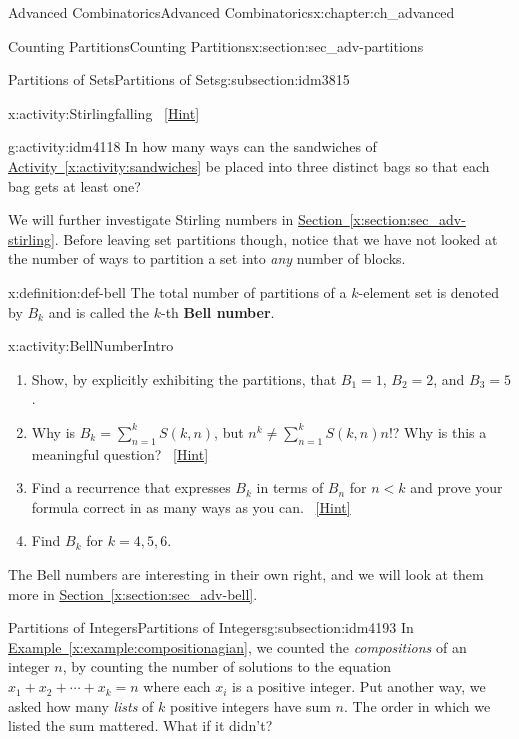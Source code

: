 \documentclass[oneside,10pt,]{book}
\newcommand{\terminology}[1]{\textbf{#1}}
\numberwithin{equation}{chapter}
\newcommand{\lt}{<}
\begin{document}
\begin{chapterptx}{Advanced Combinatorics}{}{Advanced Combinatorics}{}{}{x:chapter:ch_advanced}
\begin{sectionptx}{Counting Partitions}{}{Counting Partitions}{}{}{x:section:sec_adv-partitions}
\begin{subsectionptx}{Partitions of Sets}{}{Partitions of Sets}{}{}{g:subsection:idm3815}
\begin{activity}{}{x:activity:Stirlingfalling}
\qquad~\hfill{\tiny\hyperlink{g:hint:idm4107-back}{[Hint]}}\end{activity}
\begin{activity}{}{g:activity:idm4118}%
In how many ways can the sandwiches of \hyperref[x:activity:sandwiches]{Activity~\ref{x:activity:sandwiches}} be placed into three distinct bags so that each bag gets at least one?%
\end{activity}
We will further investigate Stirling numbers in \hyperref[x:section:sec_adv-stirling]{Section~\ref{x:section:sec_adv-stirling}}.  Before leaving set partitions though, notice that we have not looked at the number of ways to partition a set into \emph{any} number of blocks.%
\begin{definition}{}{x:definition:def-bell}%
%
%
The total number of partitions of a \(k\)-element set is denoted by \(B_k\) and is called the \(k\)-th \terminology{Bell number}.%
\end{definition}
\begin{activity}{}{x:activity:BellNumberIntro}%
\begin{enumerate}[font=\bfseries,label=(\alph*),ref=\alph*]
\item{}Show, by explicitly exhibiting the partitions, that \(B_1 = 1\), \(B_2 = 2\), and \(B_3 = 5\).%
\item{}Why is \(B_k = \sum_{n=1}^{k} S(k,n)\), but \(n^k \ne \sum_{n=1}^k S(k,n)n!\)?  Why is this a meaningful question?%
\qquad~\hfill{\tiny\hyperlink{g:hint:idm4156-back}{[Hint]}}\item{}Find a recurrence that expresses \(B_k\) in terms of \(B_n\) for \(n\lt  k\) and prove your formula correct in as many ways as you can.%
\qquad~\hfill{\tiny\hyperlink{g:hint:idm4166-back}{[Hint]}}\item{}Find \(B_k\) for \(k=4,5,6\).%
\end{enumerate}
\end{activity}
The Bell numbers are interesting in their own right, and we will look at them more in \hyperref[x:section:sec_adv-bell]{Section~\ref{x:section:sec_adv-bell}}.%
\end{subsectionptx}
%
%
\typeout{************************************************}
\typeout{************************************************}
%
\begin{subsectionptx}{Partitions of Integers}{}{Partitions of Integers}{}{}{g:subsection:idm4193}
In \hyperref[x:example:compositionagian]{Example~\ref{x:example:compositionagian}}, we counted the \emph{compositions} of an integer \(n\), by counting the number of solutions to the equation \(x_1 + x_2 + \cdots + x_k = n\) where each \(x_i\) is a positive integer.  Put another way, we asked how many \emph{lists} of \(k\) positive integers have sum \(n\).  The order in which we listed the sum mattered.  What if it didn't?%

\end{subsectionptx}
\end{sectionptx}
\end{chapterptx}
\end{document}
